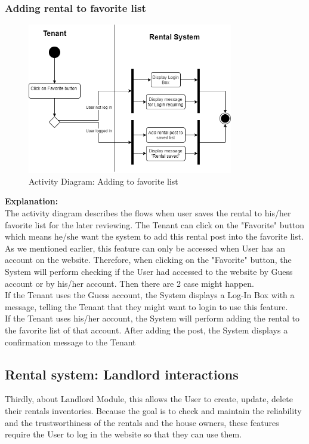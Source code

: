 \subsubsection{Adding rental to favorite list}
\begin{figure}[H]
    \centering
    \includegraphics[width=0.8\textwidth]{Images/Activity/ac_diag_add_favorite.png}
    \caption{Activity Diagram: Adding to favorite list}
    \label{fig:add-favorite}
\end{figure}
\noindent \textbf{Explanation:}\\
The activity diagram describes the flows when user saves the rental to his/her favorite list for the later reviewing. The Tenant can click on the "Favorite" button which means he/she want the system to add this rental post into the favorite list. As we mentioned earlier, this feature can only be accessed when User has an account on the website. Therefore, when clicking on the "Favorite" button, the System will perform checking if the User had accessed to the website by Guess account or by his/her account. Then there are 2 case might happen.\\
If the Tenant uses the Guess account, the System displays a Log-In Box with a message, telling the Tenant that they might want to login to use this feature.\\
If the Tenant uses his/her account, the System will perform adding the rental to the favorite list of that account. After adding the post, the System displays a confirmation message to the Tenant 



\newpage
\subsection{Rental system: Landlord interactions}
Thirdly, about Landlord Module, this allows the User to create, update, delete their rentals inventories. Because the goal is to check and maintain the reliability and the trustworthiness of the rentals and the house owners, these features require the User to log in the website so that they can use them. 
